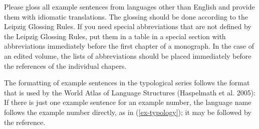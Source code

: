 Please gloss all example sentences from languages other than English and provide them with idiomatic translations. The glossing should be done according
to the Leipzig Glossing Rules. 
If you need special abbreviations that are not defined by the Leipzig Glossing Rules, put them in a table in a special section with abbreviations immediately before the first chapter of a monograph. In the case of an edited volume, the lists of abbreviations should be placed immediately before the references of the individual chapers.

The formatting of example sentences in the typological series follows the format that is used by the World Atlas of Language Structures (Haspelmath et al. 2005): If there is just one example sentence for an example number, the language name follows the example number directly, as in (\ref{ex-typology}); it may be followed by the reference.

